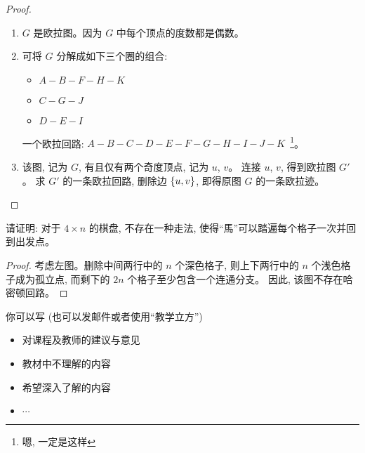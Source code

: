 \documentclass[a4paper, justified]{tufte-handout}
\begin{document}
\begin{proof}
  \begin{enumerate}[(1)]
    \item $G$ 是欧拉图。因为 $G$ 中每个顶点的度数都是偶数。
    \item 可将 $G$ 分解成如下三个圈的组合:
      \begin{itemize}
        \item $A-B-F-H-K$
        \item $C-G-J$
        \item $D-E-I$
      \end{itemize}
      一个欧拉回路: $A-B-C-D-E-F-G-H-I-J-K$~\footnote{嗯, 一定是这样}。
    \item 该图, 记为 $G$, 有且仅有两个奇度顶点, 记为 $u$, $v$。
      连接 $u$, $v$, 得到欧拉图 $G'$。
      求 $G'$ 的一条欧拉回路, 删除边 $\{u, v\}$, 即得原图 $G$ 的一条欧拉迹。
  \end{enumerate}
\end{proof}

\begin{problem}
  请证明: 对于 $4 \times n$ 的棋盘, 不存在一种走法,
  使得``馬''可以踏遍每个格子一次并回到出发点。
\end{problem}

\begin{proof}
  考虑左图。删除中间两行中的 $n$ 个深色格子,
  则上下两行中的 $n$ 个浅色格子成为孤立点, 而剩下的 $2n$ 个格子至少包含一个连通分支。
  因此, 该图不存在哈密顿回路。
\end{proof}


\begincorrection

\beginfb

你可以写 (也可以发邮件或者使用``教学立方'')
\begin{itemize}
  \item 对课程及教师的建议与意见
  \item 教材中不理解的内容
  \item 希望深入了解的内容
  \item $\cdots$
\end{itemize}
\end{document}
